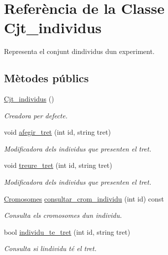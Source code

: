 \hypertarget{class_cjt__individus}{}\section{Referència de la Classe Cjt\+\_\+individus}
\label{class_cjt__individus}


Representa el conjunt d\textquotesingle{}individus d\textquotesingle{}un experiment.  


\subsection*{Mètodes públics}
\begin{DoxyCompactItemize}
\item 
\hyperlink{class_cjt__individus_ace12a900a02d3b12c8067c7867618c50}{Cjt\+\_\+individus} ()
\begin{DoxyCompactList}\small\item\em Creadora per defecte. \end{DoxyCompactList}\item 
void \hyperlink{class_cjt__individus_a66d3e1b39b40532a2e2cff60fbf0b72a}{afegir\+\_\+tret} (int id, string tret)
\begin{DoxyCompactList}\small\item\em Modificadora dels individus que presenten el tret. \end{DoxyCompactList}\item 
void \hyperlink{class_cjt__individus_ab2f75f67eeaa424ffe8773e47d3223e8}{treure\+\_\+tret} (int id, string tret)
\begin{DoxyCompactList}\small\item\em Modificadora dels individus que presenten el tret. \end{DoxyCompactList}\item 
\hyperlink{class_cromosomes}{Cromosomes} \hyperlink{class_cjt__individus_a5c98261f78513b1b008cead471d8afa5}{consultar\+\_\+crom\+\_\+individu} (int id) const 
\begin{DoxyCompactList}\small\item\em Consulta els cromosomes d\textquotesingle{}un individu. \end{DoxyCompactList}\item 
bool \hyperlink{class_cjt__individus_ab7ef8ea63550958f2025a684dc804308}{individu\+\_\+te\+\_\+tret} (int id, string tret)
\begin{DoxyCompactList}\small\item\em Consulta si l\textquotesingle{}individu té el tret. \end{DoxyCompactList}\item 

\end{DoxyCompactItemize}
